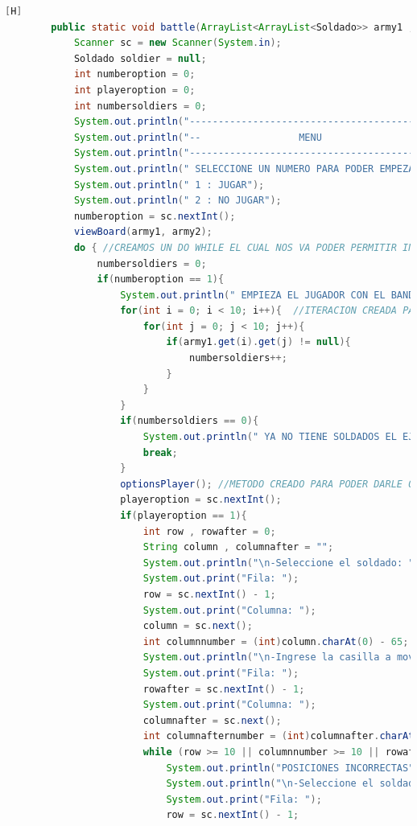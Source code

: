 \documentclass{article}
\begin{document}
	\begin{lstlisting}[language=java,caption={Las lineas de codigos del metodo creado:}][H]
		public static void battle(ArrayList<ArrayList<Soldado>> army1 , ArrayList<ArrayList<Soldado>> army2){
			Scanner sc = new Scanner(System.in);
			Soldado soldier = null;
			int numberoption = 0;
			int playeroption = 0;
			int numbersoldiers = 0;
			System.out.println("-------------------------------------------");
			System.out.println("--                 MENU                  --"); 
			System.out.println("-------------------------------------------");
			System.out.println(" SELECCIONE UN NUMERO PARA PODER EMPEZAR O TERMINAR");
			System.out.println(" 1 : JUGAR");
			System.out.println(" 2 : NO JUGAR");
			numberoption = sc.nextInt();
			viewBoard(army1, army2);
			do { //CREAMOS UN DO WHILE EL CUAL NOS VA PODER PERMITIR INTERACTUAR CON LOS JUGADORES PARA EL EMPEZAR EL JUEGO EL CUAL TENDRA QUE HACER VUELTAS INFINITAS PARA PODER INTERACTUAR CON LOS JUGADORES
				numbersoldiers = 0;
				if(numberoption == 1){
					System.out.println(" EMPIEZA EL JUGADOR CON EL BANDO --X-- ");
					for(int i = 0; i < 10; i++){  //ITERACION CREADA PARA PODER SABER QUE SI ESTE BANDO DEL EJERCITO TIENE SOLDADOS PARA PODER JUGAR EL CUAL VAMOS A TENER QUE CONTAR
						for(int j = 0; j < 10; j++){
							if(army1.get(i).get(j) != null){
								numbersoldiers++;
							}
						}
					}
					if(numbersoldiers == 0){
						System.out.println(" YA NO TIENE SOLDADOS EL EJERCITO --X-- USTED HA PERDIDO POR LO TANTO GANO EL EJERCITO --Y-- ");
						break;
					}
					optionsPlayer(); //METODO CREADO PARA PODER DARLE OPCIONES AL JUGADOR QUE JUGADA REALIZAR O RETIRARSE DEL JUEGO
					playeroption = sc.nextInt();
					if(playeroption == 1){
						int row , rowafter = 0;
						String column , columnafter = "";
						System.out.println("\n-Seleccione el soldado: ");
						System.out.print("Fila: ");
						row = sc.nextInt() - 1;
						System.out.print("Columna: ");
						column = sc.next();
						int columnnumber = (int)column.charAt(0) - 65; 
						System.out.println("\n-Ingrese la casilla a mover");
						System.out.print("Fila: ");
						rowafter = sc.nextInt() - 1;
						System.out.print("Columna: ");
						columnafter = sc.next();
						int columnafternumber = (int)columnafter.charAt(0) - 65;  
						while (row >= 10 || columnnumber >= 10 || rowafter >= 10 || columnafternumber >= 10) {
							System.out.println("POSICIONES INCORRECTAS");
							System.out.println("\n-Seleccione el soldado: ");
							System.out.print("Fila: ");
							row = sc.nextInt() - 1;

\end{lstlisting}
\end{document}
